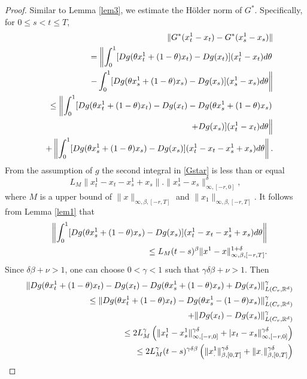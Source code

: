 \documentclass[graybox]{svmult}
\newcommand{\R}{\ensuremath{\mathbb{R}}}
\begin{document}
\begin{proof}
	Similar to Lemma \ref{lem3}, we estimate the H\"older norm of $G^*$. Specifically, for $0\leq s<t\leq T$, 
	\begin{eqnarray}\label{Gstar}
	&&\|G^*(x^1_t-x_t)-G^*(x^1_s-x_s)\|\notag\\
	&&=\left\| \int_0^1[Dg(\theta x^1_t+(1-\theta)x_t) -Dg(x_t)](x^1_t-x_t)d\theta \right.\notag\\
	&&\qquad \left.- \int_0^1[Dg(\theta x^1_s+(1-\theta)x_s) -Dg(x_s)](x^1_s-x_s)d\theta \right\|   \notag \\
	&&\leq  \left\| \int_0^1[Dg(\theta x^1_t+(1-\theta)x_t) -Dg(x_t)- Dg(\theta x^1_s+(1-\theta)x_s) \right.\notag\\
	&&\qquad +Dg(x_s)](x^1_t-x_t)d\theta \Big\|\notag \\
	&& +\left\| \int_0^1[Dg(\theta x^1_s+(1-\theta)x_s) -Dg(x_s)](x^1_t-x_t - x^1_s+x_s)d\theta \right\|.
	\end{eqnarray}
	From the assumption of $g$ the second integral in  \eqref{Gstar}  is less than or equal 
	$$
	L_M\|x^1_t-x_t - x^1_s+x_s\| .\|x^1_s-x_s\|^\delta_{\infty,[-r,0]},
	$$
	where $M$ is a upper bound of $\|x\|_{\infty,\beta,[-r,T]}$ and $\|x_1\|_{\infty,\beta,[-r,T]}$. %
	It follows from Lemma \ref{lem1} that
	\begin{eqnarray}\label{Gstar2}
	&&\left\| \int_0^1[Dg(\theta x^1_s+(1-\theta)x_s) -Dg(x_s)](x^1_t-x_t - x^1_s+x_s)d\theta \right\| \notag\\
	&&\leq   L_M(t-s)^\beta\|x^1-x\|^{1+\delta}_{\infty,\beta,[-r,T]}.
	\end{eqnarray}
	Since $\delta\beta+\nu>1$, one can choose $0<\gamma<1$ such that $\gamma\delta\beta+\nu>1$. Then
	\begin{eqnarray}
	&&\|Dg(\theta x^1_t+(1-\theta)x_t) -Dg(x_t)- Dg(\theta x^1_s+(1-\theta)x_s) +Dg(x_s)\|_{L(C_r,\R^d)}^\gamma   \notag    \\
	&&\leq  \|Dg(\theta x^1_t+(1-\theta)x_t) - Dg(\theta x^1_s-(1-\theta)x_s)\|_{L(C_r,\R^d)}^\gamma\notag\\
	&&\qquad +\|Dg(x_t) -Dg(x_s)\|_{L(C_r,\R^d)}^\gamma\notag\\
	&&\leq  2L_M^\gamma \left(\|x^1_t-x^1_s\|^{\gamma\delta}_{\infty,[-r,0]}+ |x_t-x_s\|^{\gamma\delta}_{\infty,[-r,0]}\right)\notag\\
	&&\leq  2L_M^\gamma (t-s)^{\gamma\delta\beta}\left(\|x^1_.\|^{\gamma\delta}_{\beta,[0,T]}+ \|x_.\|^{\gamma\delta}_{\beta,[0,T]}\right)\notag\\

\end{eqnarray}
\end{proof}
\end{document}

